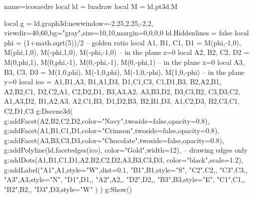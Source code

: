\begin{luadraw}{name=icosaedre}
local ld = luadraw
local M = ld.pt3d.M

local g = ld.graph3d:new{window={-2.25,2.25,-2,2}, viewdir={40,60},bg="gray",size={10,10},margin={0,0,0,0}}
ld.Hiddenlines = false
local phi = (1+math.sqrt(5))/2 -- golden ratio
local A1, B1, C1, D1 = M(phi,-1,0), M(phi,1,0), M(-phi,1,0), M(-phi,-1,0) -- in the plane z=0
local A2, B2, C2, D2 = M(0,phi,1), M(0,phi,-1), M(0,-phi,-1), M(0,-phi,1) -- in the plane x=0
local A3, B3, C3, D3 = M(1,0,phi), M(-1,0,phi), M(-1,0,-phi), M(1,0,-phi) -- in the plane y=0
local ico = {
{A1,B1,A3}, {B1,A1,D3}, {D1,C1,C3}, {C1,D1,B3},
{B2,A2,B1}, {A2,B2,C1}, {D2,C2,A1}, {C2,D2,D1},
{B3,A3,A2}, {A3,B3,D2}, {D3,C3,B2}, {C3,D3,C2},
{A1,A3,D2}, {B1,A2,A3}, {A2,C1,B3}, {D1,D2,B3},
{B2,B1,D3}, {A1,C2,D3}, {B2,C3,C1}, {C2,D1,C3} }
g:Dscene3d(
    g:addFacet({A2,B2,C2,D2},{color="Navy",twoside=false,opacity=0.8}),
    g:addFacet({A1,B1,C1,D1},{color="Crimson",twoside=false,opacity=0.8}),
    g:addFacet({A3,B3,C3,D3},{color="Chocolate",twoside=false,opacity=0.8}),
    g:addPolyline(ld.facetedges(ico), {color="Gold",width=12}), -- drawing edges only
    g:addDots({A1,B1,C1,D1,A2,B2,C2,D2,A3,B3,C3,D3}, {color="black",scale=1.2}),
    g:addLabel("A1",A1,{style="W",dist=0.1}, "B1",B1,{style="S"}, "C2",C2,{}, "C3",C3,{},
        "A3",A3,{style="N"}, "D1",D1,{}, "A2",A2,{}, "D2",D2,{}, "B3",B3,{style="E"},
        "C1",C1,{}, "B2",B2,{}, "D3",D3,{style="W"} )
)
g:Show()
\end{luadraw}
